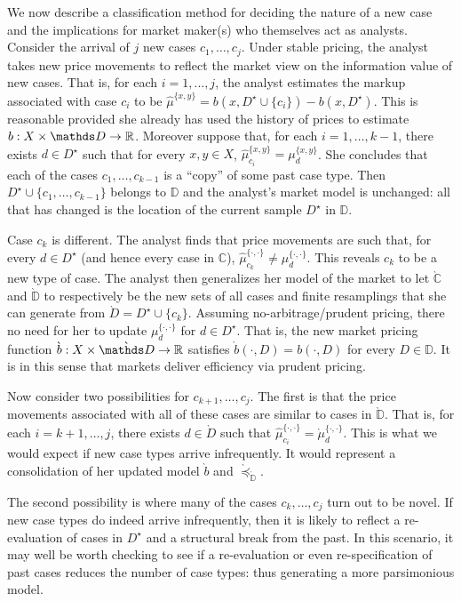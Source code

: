 \documentclass[12pt,a4paper,twoside]{article}
\newcommand{\mbbd}{{\mathds D}}
\newcommand{\mbbc}{{\mathds C}}
\newcommand{\past}{{D^\star}}
\begin{document}
We now describe a classification method for deciding the nature of a new case
and the implications for market maker(s) who themselves act as analysts.
Consider the arrival of $j$ new cases ${c}_1, \dots, {c}_j$.  Under stable
pricing, the analyst takes new price movements to reflect the market view on
the information value of new cases.  That is, for each $i = 1,\dots, j$, the
analyst estimates the markup associated with case $c_i$ to be
$\hat{\mu}^{\{x,y\}} = b(x, \past \cup \{c_i\}) - b(x, \past) $.  This is
reasonable provided she already has used the history of prices to estimate
$b:X\times \mbbd \rightarrow \R$. Moreover suppose that, for each $i = 1,
\dots, k-1$, there exists $d\in \past$ such that for every $x,y \in X$,
$\hat{\mu}^{\{x,y\}}_{c_i} = \mu^{\{x,y\}}_{d}$.  She concludes that each of
the cases $c_1, \dots, c_{k-1}$ is a ``copy'' of some past case type. Then
$\past \cup \{c_1, \dots, c_{k-1}\}$ belongs to $\mbbd$ and the analyst's
market model is unchanged: all that has changed is the location of the current
sample $\past$ in $\mbbd$.

Case $c_{k}$ is different. The analyst finds that price movements are such
that, for every $d \in \past$ (and hence every case in $\mbbc$),
$\hat{\mu}^{\{\cdot,\cdot\}}_{c_{k}} \neq \mu^{\{\cdot,\cdot\}}_{d}$.  This
reveals $c_{k}$ to be a new type of case.  The analyst then {generalizes} her model
of the market to let $\grave{\mbbc}$ and $\grave{\mbbd}$ to respectively be the
new sets of all cases and finite resamplings that she can generate from
$\grave{D} = \past \cup \{c_{k}\}$. Assuming no-arbitrage/prudent pricing,
there no need for her to update $\mu^{\{\cdot,\cdot\}}_{d}$ for $d \in \past$.
That is, the new market pricing function $\grave{b}: X \times \grave{\mbbd}
\rightarrow \R$ satisfies $\grave{b}(\cdot, D) = b(\cdot, D)$ for every $D \in
\mbbd$. It is in this sense that markets deliver efficiency via prudent
pricing.

Now consider two possibilities for $c_{k+1},\dots,c_{j}$. The first is that the
price movements associated with all of these cases are similar to cases in
$\grave{\mbbd}$. That is, for each $i=k+1,\dots,j$, there exists $d\in
\grave{D}$ such that $\hat{\mu}^{\{\cdot,\cdot\}}_{c_{i}} =
\grave{\mu}^{\{\cdot,\cdot\}}_{d}$. This is what we would expect if new case
types arrive infrequently. It would represent a consolidation of her updated
model $\grave{b}$ and $\grave{\preceq}_{\grave{\mbbd}}$.

The second possibility is where many of the cases $c_{k},\dots,c_{j}$ turn out
to be novel.  If new case types do indeed arrive infrequently, then it is
likely to reflect a re-evaluation of cases in $\past$ and a structural break
from the past. In this scenario, it may well be worth checking to see if a
re-evaluation or even re-specification of past cases reduces the number of case
types: thus generating a more parsimonious model.
\end{document}
